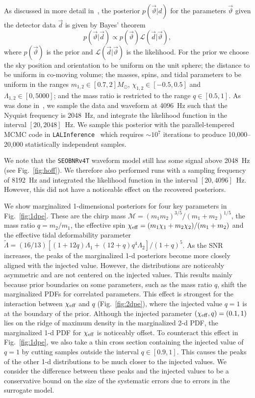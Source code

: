 \documentclass[prd,aps,letter,twocolumn,floatfix,notitlepage,nofootinbib]{revtex4-1}
\begin{document}
As discussed in more detail in~\cite{BNSPE}, the posterior $p(\vec\vartheta | d)$ for the parameters $\vec\vartheta$ given the detector data $\vec d$ is given by Bayes' theorem
\begin{equation}
p(\vec\vartheta | \vec d) \propto p(\vec\vartheta) \mathcal{L}(\vec d | \vec\vartheta),
\end{equation}
where $p(\vec\vartheta)$ is the prior and $\mathcal{L}(\vec d | \vec\vartheta)$ is the likelihood. 
For the prior we choose the sky position and orientation to be uniform on the unit sphere; the distance to be uniform in co-moving volume; the masses, spins, and tidal parameters to be uniform in the ranges $m_{1, 2} \in [0.7, 2]M_\odot$, $\chi_{1,2} \in [-0.5, 0.5]$ and $\Lambda_{1,2} \in [0, 5000]$; and the mass ratio is restricted to the range $q\in[0.5, 1]$. 
As was done in~\cite{BNSPE}, we sample the data and waveform at 4096~Hz such that the Nyquist frequency is 2048~Hz, and integrate the likelihood function in the interval $[20, 2048]$~Hz. We sample this posterior with the parallel-tempered MCMC code in \texttt{LALInference}~\cite{lal} which requires $\sim 10^7$ iterations to produce 10,000--20,000 statistically independent samples. 

We note that the \texttt{SEOBNRv4T} waveform model still has some signal above 2048~Hz (see Fig.~\ref{fig:hoff}). We therefore also performed runs with a sampling frequency of 8192~Hz and integrated the likelihood function in the interval $[20, 4096]$~Hz. However, this did not have a noticeable effect on the recovered posteriors.

We show marginalized 1-dimensional posteriors for four key parameters in Fig.~\ref{fig:1dpe}. These are the chirp mass $\mathcal{M} = (m_1 m_2)^{3/5}/(m_1+m_2)^{1/5}$, the mass ratio $q=m_2/m_1$, the effective spin $\chi_{\rm eff} = (m_1\chi_1+m_2\chi_2)/(m_1+m_2)$ and the effective tidal deformability parameter $\tilde\Lambda = (16/13) [(1+12q)\Lambda_1 + (12+q)q^4\Lambda_2]/(1+q)^5$. As the SNR increases, the peaks of the marginalized 1-d posteriors become more closely aligned with the injected value. However, the distributions are noticeably asymmetric and are not centered on the injected values. 
This results mainly because prior boundaries on some parameters, such as the mass ratio $q$, shift the marginalized PDFs for correlated parameters.
This effect is strongest for the interaction between $\chi_{\rm eff}$ and $q$ (Fig.~\ref{fig:2dpe}), where the injected value $q=1$ is at the boundary of the prior. Although the injected parameter $(\chi_{\rm eff}, q) = (0.1, 1)$ lies on the ridge of maximum density in the marginalized 2-d PDF, the marginalized 1-d PDF for $\chi_{\rm eff}$ is noticeably offset. To counteract this effect in Fig.~\ref{fig:1dpe}, we also take a thin cross section containing the injected value of $q=1$ by cutting samples outside the interval $q \in [0.9, 1]$. This causes the peaks of the other 1-d distributions to be much closer to the injected values. We consider the difference between these peaks and the injected values to be a conservative bound on the size of the systematic errors due to errors in the surrogate model.
\end{document}
